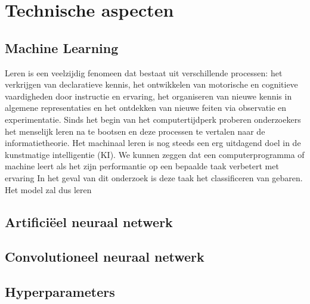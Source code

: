 \chapter{Technische aspecten}
\section{Machine Learning}
\npar Leren is een veelzijdig fenomeen dat bestaat uit  verschillende processen: het verkrijgen van declaratieve kennis, het ontwikkelen van motorische en cognitieve vaardigheden door instructie en ervaring, het organiseren van nieuwe kennis in algemene representaties en het ontdekken van nieuwe feiten via observatie en experimentatie.
\npar Sinds het begin van het computertijdperk proberen onderzoekers het menselijk leren na te bootsen en deze processen te vertalen naar de informatietheorie. Het machinaal leren is nog steeds een erg uitdagend doel in de kunstmatige intelligentie (KI).
\npar We kunnen zeggen dat een computerprogramma of machine leert als het zijn performantie op een bepaalde taak verbetert met ervaring \cite{machine_overview}
\npar In het geval van dit onderzoek is deze taak het classificeren van gebaren. Het model zal dus leren 
\section{Artifici\"eel neuraal netwerk}

\section{Convolutioneel neuraal netwerk}
\section{Hyperparameters}